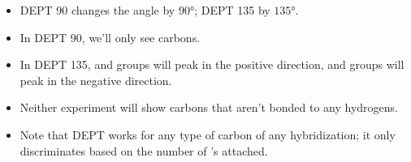 \documentclass[../notes.tex]{subfiles}
\begin{document}
\begin{itemize}
    \begin{itemize}
        \item DEPT 90 changes the angle by $\ang{90}$; DEPT 135 by $\ang{135}$.
        \item In DEPT 90, we'll only see  carbons.
        \item In DEPT 135,  and  groups will peak in the positive direction, and  groups will peak in the negative direction.
        \item Neither experiment will show carbons that aren't bonded to any hydrogens.
        \item Note that DEPT works for any type of carbon of any hybridization; it only discriminates based on the number of 's attached.
    \end{itemize}
\end{itemize}
\end{document}
